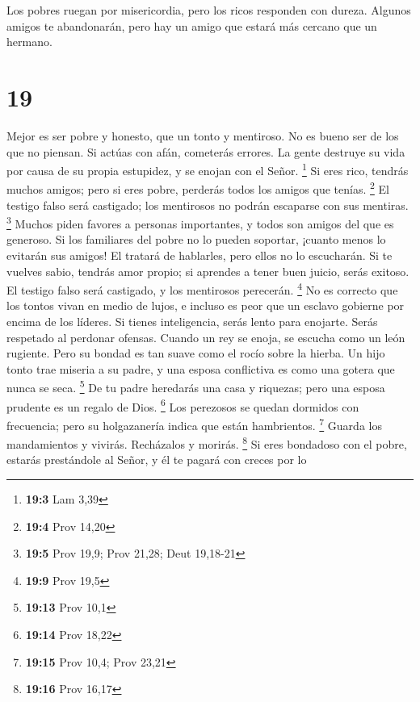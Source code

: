  Los pobres ruegan por misericordia, pero los ricos
responden con dureza.  Algunos amigos te abandonarán, pero
hay un amigo que estará más cercano que un hermano.

\hypertarget{section-18}{%
\section{19}\label{section-18}}

 Mejor es ser pobre y honesto, que un tonto y mentiroso.
 No es bueno ser de los que no piensan. Si actúas con afán,
cometerás errores.  La gente destruye su vida por causa de
su propia estupidez, y se enojan con el Señor. \footnote{\textbf{19:3}
  Lam 3,39}  Si eres rico, tendrás muchos amigos; pero si
eres pobre, perderás todos los amigos que tenías. \footnote{\textbf{19:4}
  Prov 14,20}  El testigo falso será castigado; los
mentirosos no podrán escaparse con sus mentiras. \footnote{\textbf{19:5}
  Prov 19,9; Prov 21,28; Deut 19,18-21}  Muchos piden
favores a personas importantes, y todos son amigos del que es generoso.
 Si los familiares del pobre no lo pueden soportar, ¡cuanto
menos lo evitarán sus amigos! El tratará de hablarles, pero ellos no lo
escucharán.  Si te vuelves sabio, tendrás amor propio; si
aprendes a tener buen juicio, serás exitoso.  El testigo
falso será castigado, y los mentirosos perecerán. \footnote{\textbf{19:9}
  Prov 19,5}  No es correcto que los tontos vivan en medio
de lujos, e incluso es peor que un esclavo gobierne por encima de los
líderes.  Si tienes inteligencia, serás lento para
enojarte. Serás respetado al perdonar ofensas.  Cuando un
rey se enoja, se escucha como un león rugiente. Pero su bondad es tan
suave como el rocío sobre la hierba.  Un hijo tonto trae
miseria a su padre, y una esposa conflictiva es como una gotera que
nunca se seca. \footnote{\textbf{19:13} Prov 10,1}  De tu
padre heredarás una casa y riquezas; pero una esposa prudente es un
regalo de Dios. \footnote{\textbf{19:14} Prov 18,22}  Los
perezosos se quedan dormidos con frecuencia; pero su holgazanería indica
que están hambrientos. \footnote{\textbf{19:15} Prov 10,4; Prov 23,21}
 Guarda los mandamientos y vivirás. Recházalos y morirás.
\footnote{\textbf{19:16} Prov 16,17}  Si eres bondadoso con
el pobre, estarás prestándole al Señor, y él te pagará con creces por lo
